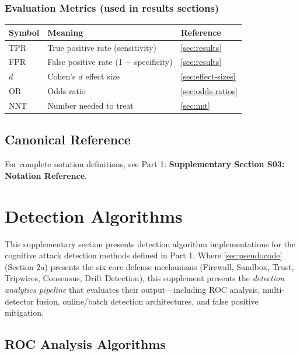 \documentclass[
]{article}
\newcounter{none} %
\begin{document}
\subsubsection{Evaluation Metrics (used in results
sections)}\label{evaluation-metrics-used-in-results-sections}

{\def\LTcaptype{none} %
\begin{longtable}[]{@{}lll@{}}
\toprule\noalign{}
Symbol & Meaning & Reference \\
\midrule\noalign{}
\endhead
\bottomrule\noalign{}
\endlastfoot
TPR & True positive rate (sensitivity) & \cref{sec:results} \\
FPR & False positive rate (1 \(-\) specificity) & \cref{sec:results} \\
\(d\) & Cohen's \(d\) effect size & \cref{sec:effect-sizes} \\
OR & Odds ratio & \cref{sec:odds-ratios} \\
NNT & Number needed to treat & \cref{sec:nnt} \\
\end{longtable}
}

\subsection{Canonical Reference}\label{canonical-reference}

For complete notation definitions, see Part 1: \textbf{Supplementary
Section S03: Notation Reference}.

\newpage

\newpage

\section{Detection Algorithms}\label{sec:detection-algorithms}

This supplementary section presents detection algorithm implementations
for the cognitive attack detection methods defined in Part 1. Where
\cref{sec:pseudocode} (Section 2a) presents the six core defense
mechanisms (Firewall, Sandbox, Trust, Tripwires, Consensus, Drift
Detection), this supplement presents the \emph{detection analytics
pipeline} that evaluates their output---including ROC analysis,
multi-detector fusion, online/batch detection architectures, and false
positive mitigation.

\subsection{ROC Analysis Algorithms}\label{roc-analysis-algorithms}
\end{document}
